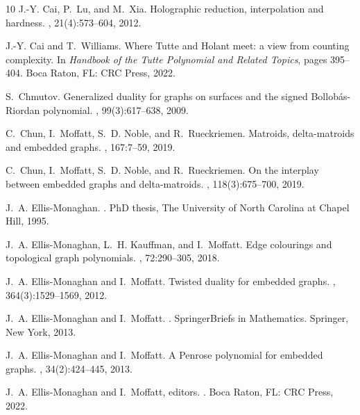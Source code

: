 \documentclass{amsart}
\theoremstyle{definition}
\theoremstyle{remark}
\numberwithin{equation}{section}
\begin{document}
\begin{thebibliography}{10}
J.-Y. Cai, P.~Lu, and M.~Xia.
\newblock Holographic reduction, interpolation and hardness.
, 21(4):573--604, 2012.

J.-Y. Cai and T.~Williams.
\newblock Where {Tutte} and {Holant} meet: a view from counting complexity.
\newblock In {\em Handbook of the Tutte Polynomial and Related Topics}, pages 395--404. Boca Raton, FL: CRC Press, 2022.

S.~Chmutov.
\newblock Generalized duality for graphs on surfaces and the signed {Bollob{\'a}s}-{Riordan} polynomial.
, 99(3):617--638, 2009.

C.~Chun, I.~Moffatt, S.~D. Noble, and R.~Rueckriemen.
\newblock Matroids, delta-matroids and embedded graphs.
, 167:7--59, 2019.

C.~Chun, I.~Moffatt, S.~D. Noble, and R.~Rueckriemen.
\newblock On the interplay between embedded graphs and delta-matroids.
, 118(3):675--700, 2019.

J.~A. Ellis-Monaghan.
.
\newblock PhD thesis, The University of North Carolina at Chapel Hill, 1995.

J.~A. Ellis-Monaghan, L.~H. Kauffman, and I.~Moffatt.
\newblock Edge colourings and topological graph polynomials.
, 72:290--305, 2018.

J.~A. Ellis-Monaghan and I.~Moffatt.
\newblock Twisted duality for embedded graphs.
, 364(3):1529--1569, 2012.

J.~A. Ellis-Monaghan and I.~Moffatt.
.
\newblock SpringerBriefs in Mathematics. Springer, New York, 2013.

J.~A. Ellis-Monaghan and I.~Moffatt.
\newblock A {P}enrose polynomial for embedded graphs.
, 34(2):424--445, 2013.

J.~A. Ellis-Monaghan and I.~Moffatt, editors.
.
\newblock Boca Raton, FL: CRC Press, 2022.


\end{thebibliography}
\end{document}
